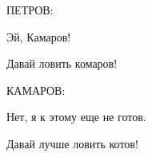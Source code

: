 
ПЕТРОВ:
       
Эй, Камаров!
       
Давай ловить комаров!
    
КАМАРОВ:
       
Нет, я к этому еще не готов.
      
Давай лучше ловить котов!
